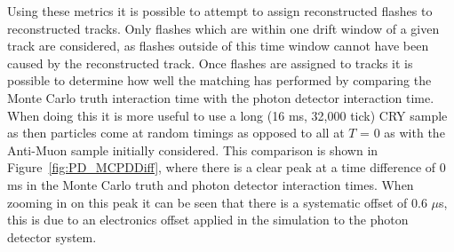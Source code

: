 Using these metrics it is possible to attempt to assign reconstructed flashes to reconstructed tracks. Only flashes which are within one drift window of a given track are considered, as flashes outside of this time window cannot have been caused by the reconstructed track. Once flashes are assigned to tracks it is possible to determine how well the matching has performed by comparing the Monte Carlo truth interaction time with the photon detector interaction time. When doing this it is more useful to use a long (16 ms, 32,000 tick) CRY sample as then particles come at random timings as opposed to all at $T$ = 0 as with the Anti-Muon sample initially considered. This comparison is shown in Figure~\ref{fig:PD_MCPDDiff}, where there is a clear peak at a time difference of 0 ms in the Monte Carlo truth and photon detector interaction times. When zooming in on this peak it can be seen that there is a systematic offset of 0.6 $\mu$s, this is due to an electronics offset applied in the simulation to the photon detector system. \\

